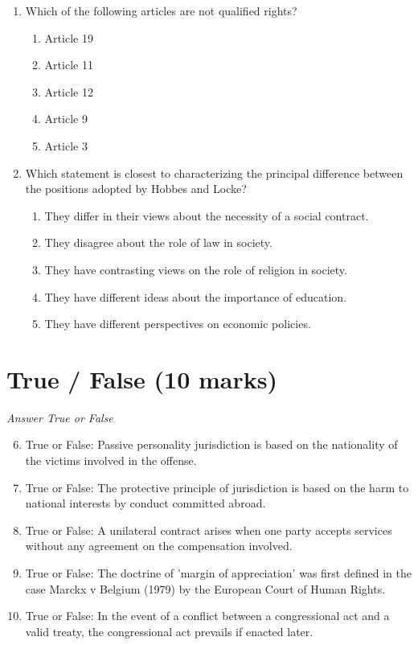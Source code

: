 \documentclass[12pt]{article}
\begin{document}
\begin{enumerate}[label=\arabic*.]
\begin{enumerate}[label=(\alph*)]
\end{enumerate}
\item Which of the following articles are not qualified rights?
\begin{enumerate}[label=(\alph*)]
    \item Article 19
    \item Article 11
    \item Article 12
    \item Article 9
    \item Article 3
\end{enumerate}
\item Which statement is closest to characterizing the principal difference between the positions adopted by Hobbes and Locke?
\begin{enumerate}[label=(\alph*)]
    \item They differ in their views about the necessity of a social contract.
    \item They disagree about the role of law in society.
    \item They have contrasting views on the role of religion in society.
    \item They have different ideas about the importance of education.
    \item They have different perspectives on economic policies.
\end{enumerate}
\end{enumerate}

\section*{True / False (10 marks)}
\textit{Answer True or False}
\begin{enumerate}[label=\arabic*.]
\setcounter{enumi}{5}
\item True or False: Passive personality jurisdiction is based on the nationality of the victims involved in the offense.
\item True or False: The protective principle of jurisdiction is based on the harm to national interests by conduct committed abroad.
\item True or False: A unilateral contract arises when one party accepts services without any agreement on the compensation involved.
\item True or False: The doctrine of 'margin of appreciation' was first defined in the case Marckx v Belgium (1979) by the European Court of Human Rights.
\item True or False: In the event of a conflict between a congressional act and a valid treaty, the congressional act prevails if enacted later.
\end{enumerate}
\end{document}

